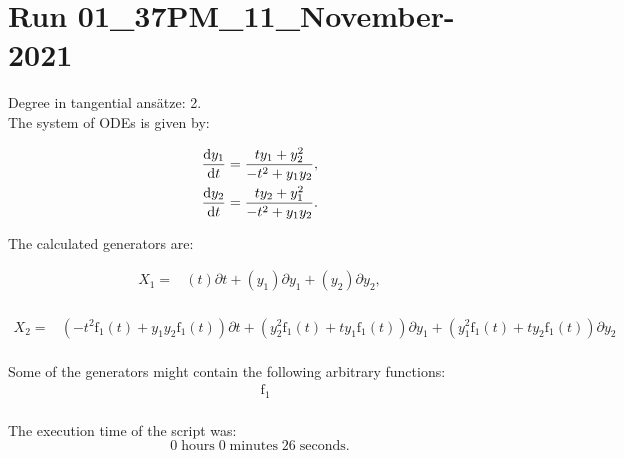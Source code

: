 \section*{Run 01\_37PM\_11\_November-2021}
Degree in tangential ansätze:	2.\\
The system of ODEs is given by:

\begin{align*}
\dv{y_{1}}{t}&=\frac{t y_{1} + y_{2}^{2}}{- t^{2} + y_{1} y_{2}},\\
\dv{y_{2}}{t}&=\frac{t y_{2} + y_{1}^{2}}{- t^{2} + y_{1} y_{2}}.\\
\end{align*}

\noindent The calculated generators are:

\begin{align*}
X_{1}=&\left(t \right)\partial t+\left(y_{1} \right)\partial y_{1}+\left(y_{2} \right)\partial y_{2},\\
\end{align*}

\begin{align*}
X_{2}=&\left(- t^{2} \operatorname{f_{1}}{\left(t \right)}+y_{1} y_{2} \operatorname{f_{1}}{\left(t \right)} \right)\partial t+\left(y_{2}^{2} \operatorname{f_{1}}{\left(t \right)}+t y_{1} \operatorname{f_{1}}{\left(t \right)} \right)\partial y_{1}+\left(y_{1}^{2} \operatorname{f_{1}}{\left(t \right)}+t y_{2} \operatorname{f_{1}}{\left(t \right)} \right)\partial y_{2}\\
\end{align*}



\noindent Some of the generators might contain the following arbitrary functions:
\begin{align*}
&\operatorname{f_{1}}\\
\end{align*}

\noindent The execution time of the script was:
$$0\;\mathrm{hours}\;0\;\mathrm{minutes}\;26 \;\mathrm{seconds}.$$
